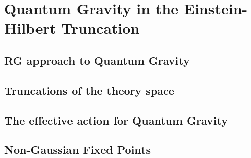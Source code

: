 \chapter{Quantum Gravity in the Einstein-Hilbert Truncation}
\section{RG approach to Quantum Gravity}

\blindtext

\section{Truncations of the theory space}

\blindtext

\section{The effective action for Quantum Gravity}

\blindtext

\section{Non-Gaussian Fixed Points}